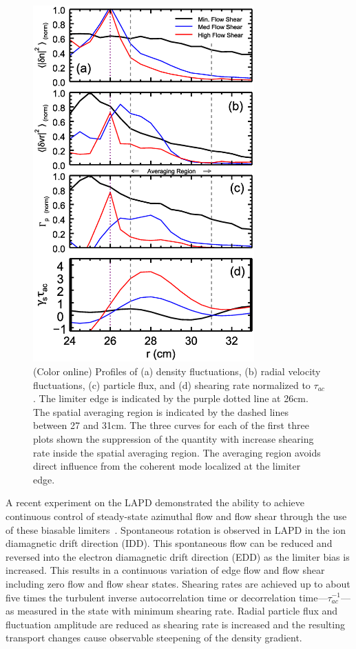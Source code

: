 \documentclass[aip,pop,amsmath,amssymb,preprint,superscriptaddress]{revtex4-1} %
\begin{document}
\begin{figure}[!htbp]
\centerline{
\includegraphics[width=8.5cm]{figure3.eps}}
\caption{\label{fig:profiles} (Color online) Profiles of (a) density fluctuations, (b) radial velocity fluctuations, (c) particle flux, and (d) shearing rate normalized to $\tau_{ac}$. The limiter edge is indicated by the purple dotted line at 26cm. The spatial averaging region is indicated by the dashed lines between 27 and 31cm. The three curves for each of the first three plots shown the suppression of the quantity with increase shearing rate inside the spatial averaging region. The averaging region avoids direct influence from the coherent mode localized at the limiter edge.}
\end{figure}

A recent experiment on the LAPD demonstrated the ability to achieve
continuous control of steady-state azimuthal flow and flow shear
through the use of these biasable
limiters~\cite{schaffner12}. Spontaneous rotation is observed in LAPD
in the ion diamagnetic drift direction (IDD).  This spontaneous flow can be
reduced and reversed into the electron diamagnetic drift direction (EDD) as the
limiter bias is increased. This results in a continuous variation of
edge flow and flow shear including zero flow and flow shear
states. Shearing rates are achieved up to about five times the
turbulent inverse autocorrelation time or decorrelation time---$\tau_{ac}^{-1}$---as measured
in the state with minimum shearing rate. Radial particle flux and
fluctuation amplitude are reduced as shearing rate is increased and
the resulting transport changes cause observable steepening of the
density gradient.
\end{document}
